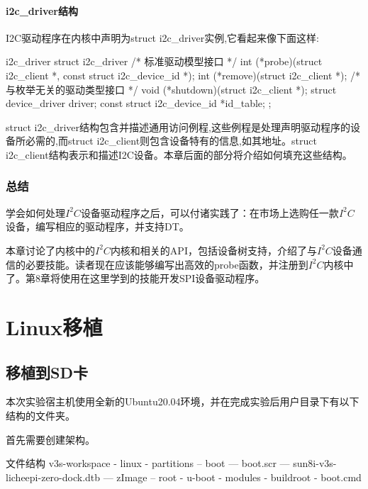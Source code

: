 \documentclass[lang=cn,newtx,10pt,scheme=chinese]{elegantbook}
\begin{document}
\subsection{i2c\_driver结构}

I2C驱动程序在内核中声明为struct i2c\_driver实例,它看起来像下面这样:

\begin{mycode}{i2c\_driver}
struct i2c_driver {
    /* 标准驱动模型接口 */
    int (*probe)(struct i2c_client *, const struct i2c_device_id *);
    int (*remove)(struct i2c_client *);
    /* 与枚举无关的驱动类型接口 */
    void (*shutdown)(struct i2c_client *);
    struct device_driver driver;
    const struct i2c_device_id *id_table;
};
\end{mycode}

struct i2c\_driver结构包含并描述通用访问例程,这些例程是处理声明驱动程序的设备所必需的,而struct i2c\_client则包含设备特有的信息,如其地址。struct i2c\_client结构表示和描述I2C设备。本章后面的部分将介绍如何填充这些结构。



\section{总结}

学会如何处理$I^2C$设备驱动程序之后，可以付诸实践了：在市场上选购任一款$I^2C$设备，编写相应的驱动程序，并支持DT。

本章讨论了内核中的$I^2C$内核和相关的API，包括设备树支持，介绍了与$I^2C$设备通信的必要技能。读者现在应该能够编写出高效的probe函数，并注册到$I^2C$内核中了。第8章将使用在这里学到的技能开发SPI设备驱动程序。

\part{Linux移植}

\chapter{移植到SD卡}

本次实验宿主机使用全新的Ubuntu20.04环境，并在完成实验后用户目录下有以下结构的文件夹。

首先需要创建架构。

\begin{mycode}{文件结构}
v3s-workspace
- linux
- partitions
-- boot
--- boot.scr
--- sun8i-v3s-licheepi-zero-dock.dtb
--- zImage
-- root
- u-boot
- modules
- buildroot
- boot.cmd
\end{mycode}
\end{document}
